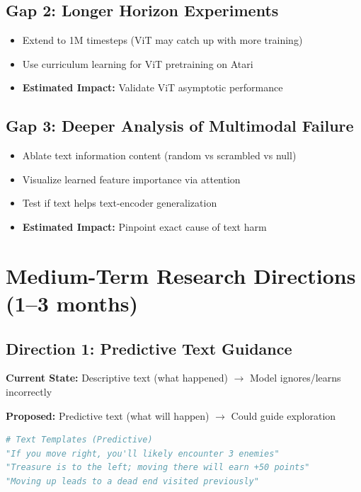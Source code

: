 \documentclass[12pt,a4paper,openany]{report}
\begin{document}
\subsection{Gap 2: Longer Horizon Experiments}

\begin{itemize}
    \item Extend to 1M timesteps (ViT may catch up with more training)
    \item Use curriculum learning for ViT pretraining on Atari
    \item \textbf{Estimated Impact:} Validate ViT asymptotic performance
\end{itemize}

\subsection{Gap 3: Deeper Analysis of Multimodal Failure}

\begin{itemize}
    \item Ablate text information content (random vs scrambled vs null)
    \item Visualize learned feature importance via attention
    \item Test if text helps text-encoder generalization
    \item \textbf{Estimated Impact:} Pinpoint exact cause of text harm
\end{itemize}

\section{Medium-Term Research Directions (1--3 months)}

\subsection{Direction 1: Predictive Text Guidance}

\textbf{Current State:} Descriptive text (what happened) $\to$ Model ignores/learns incorrectly

\textbf{Proposed:} Predictive text (what will happen) $\to$ Could guide exploration

\begin{lstlisting}[language=Python, caption=Predictive Text Templates]
# Text Templates (Predictive)
"If you move right, you'll likely encounter 3 enemies"
"Treasure is to the left; moving there will earn +50 points"
"Moving up leads to a dead end visited previously"
\end{lstlisting}
\end{document}
